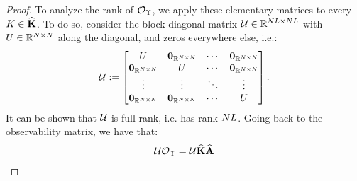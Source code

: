 \begin{proof}
	To analyze the rank of $\mathcal{O}_{\Upsilon}$, we apply these elementary matrices to every $K\in\widehat{\mathbf{K}}$. To do so, consider the block-diagonal matrix $\mathcal{U}\in\mathbb{R}^{NL\times NL}$ with $U\in\mathbb{R}^{N\times N}$ along the diagonal, and zeros everywhere else,
	i.e.:
	\begin{align}
	\mathcal{U}:= \begin{bmatrix}
	U   & \mathbf{0}_{\mathbb{R}^{N\times N}} & \cdots & \mathbf{0}_{\mathbb{R}^{N\times N}}\\
	\mathbf{0}_{\mathbb{R}^{N\times N}} & U   & \cdots & \mathbf{0}_{\mathbb{R}^{N\times N}}\\
	\vdots  & \vdots  & \ddots & \vdots\\
	\mathbf{0}_{\mathbb{R}^{N\times N}} & \mathbf{0}_{\mathbb{R}^{N\times N}} & \cdots & U
	\end{bmatrix}.
	\end{align}
	It can be shown that  $\mathcal{U}$ is full-rank, i.e. has rank $NL$. Going back to the observability matrix, we have that:
	\begin{align*}
	\bdU\Obs_{\Tset} &= \bdU\catempK\catdualopC\\

\end{align*}
\end{proof}
